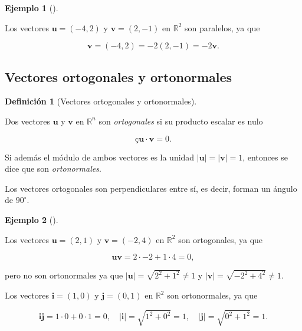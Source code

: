 \documentclass[
  a4paper,
]{scrreport}
\theoremstyle{definition}
\newtheorem{example}{Ejemplo}[chapter]
\theoremstyle{plain}
\theoremstyle{plain}
\theoremstyle{plain}
\theoremstyle{definition}
\newtheorem{definition}{Definición}[chapter]
\theoremstyle{remark}
\begin{document}
\begin{example}[]\protect\hypertarget{exm-vectores-paralelos}{}\label{exm-vectores-paralelos}

Los vectores \(\mathbf{u}=(-4,2)\) y \(\mathbf{v}=(2,-1)\) en
\(\mathbb{R}^2\) son paralelos, ya que

\[
\mathbf{v}= (-4,2) = -2(2,-1) = -2\mathbf{v}.
\]

\end{example}

\hypertarget{vectores-ortogonales-y-ortonormales}{%
\subsection{Vectores ortogonales y
ortonormales}\label{vectores-ortogonales-y-ortonormales}}

\begin{definition}[Vectores ortogonales y
ortonormales]\protect\hypertarget{def-vectores-ortogonales}{}\label{def-vectores-ortogonales}

Dos vectores \(\mathbf{u}\) y \(\mathbf{v}\) en \(\mathbb{R}^n\) son
\emph{ortogonales} si su producto escalar es nulo

\[ç
\mathbf{u}\cdot \mathbf{v} = 0.
\]

Si además el módulo de ambos vectores es la unidad
\(\lvert\mathbf{u}\rvert=\lvert\mathbf{v}\rvert=1\), entonces se dice
que son \emph{ortonormales}.

\end{definition}

Los vectores ortogonales son perpendiculares entre sí, es decir, forman
un ángulo de \(90^\circ\).

\begin{example}[]\protect\hypertarget{exm-vectores-ortogonales}{}\label{exm-vectores-ortogonales}

Los vectores \(\mathbf{u}=(2,1)\) y \(\mathbf{v}=(-2,4)\) en
\(\mathbb{R}^2\) son ortogonales, ya que

\[
\mathbf{u}\mathbf{v} = 2\cdot -2 +1\cdot 4 = 0,
\]

pero no son ortonormales ya que
\(\lvert\mathbf{u}\rvert = \sqrt{2^2+1^2} \neq 1\) y
\(\lvert \mathbf{v}\rvert = \sqrt{-2^2+4^2} \neq 1\).

Los vectores \(\mathbf{i}=(1,0)\) y \(\mathbf{j}=(0,1)\) en
\(\mathbb{R}^2\) son ortonormales, ya que

\[
\mathbf{i}\mathbf{j} = 1\cdot 0 +0\cdot 1 = 0, \quad \lvert\mathbf{i}\rvert = \sqrt{1^2+0^2} = 1,  \quad \lvert \mathbf j\rvert = \sqrt{0^2+1^2} = 1.
\]

\end{example}
\end{document}
